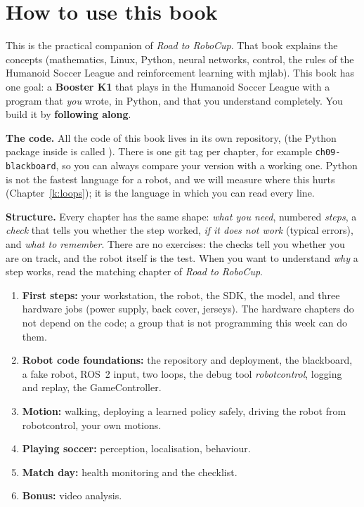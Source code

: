 \documentclass[11pt,a4paper,twoside]{book}
\begin{document}
\frontmatter
\makebooktitle
\cleardoublepage
\tableofcontents

\chapter*{How to use this book}

This is the practical companion of \emph{Road to RoboCup}. That book explains the concepts (mathematics, Linux, Python, neural networks, control, the rules of the Humanoid Soccer League and reinforcement learning with mjlab). This book has one goal: a \textbf{Booster K1} that plays in the Humanoid Soccer League with a program that \emph{you} wrote, in Python, and that you understand completely. You build it by \textbf{following along}.

\textbf{The code.} All the code of this book lives in its own repository, \coderepo\guess{} (the Python package inside is called \pkg). There is one git tag per chapter, for example \texttt{ch09-blackboard}, so you can always compare your version with a working one. Python is not the fastest language for a robot, and we will measure where this hurts (Chapter~\ref{k:loops}); it is the language in which you can read every line.

\textbf{Structure.} Every chapter has the same shape: \emph{what you need}, numbered \emph{steps}, a \emph{check} that tells you whether the step worked, \emph{if it does not work} (typical errors), and \emph{what to remember}. There are no exercises: the checks tell you whether you are on track, and the robot itself is the test. When you want to understand \emph{why} a step works, read the matching chapter of \emph{Road to RoboCup}.
\begin{enumerate}[nosep,label=\textbf{Part~\Roman*:},leftmargin=4.2em]
  \item \textbf{First steps:} your workstation, the robot, the SDK, the model, and three hardware jobs (power supply, back cover, jerseys). The hardware chapters do not depend on the code; a group that is not programming this week can do them.
  \item \textbf{Robot code foundations:} the repository and deployment, the blackboard, a fake robot, ROS~2 input, two loops, the debug tool \emph{robotcontrol}, logging and replay, the GameController.
  \item \textbf{Motion:} walking, deploying a learned policy safely, driving the robot from robotcontrol, your own motions.
  \item \textbf{Playing soccer:} perception, localisation, behaviour.
  \item \textbf{Match day:} health monitoring and the checklist.
  \item \textbf{Bonus:} video analysis.
\end{enumerate}
\end{document}
